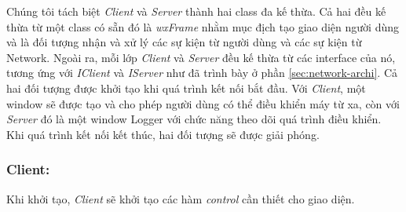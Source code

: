 Chúng tôi tách biệt \textit{Client} và \textit{Server} thành hai class đa kế thừa. Cả hai đều kế thừa từ một class có sẵn đó là \textit{wxFrame} nhằm mục địch tạo giao diện người dùng và là đối tượng nhận và xử lý các sự kiện từ người dùng và các sự kiện từ Network. Ngoài ra, mỗi lớp \textit{Client} và \textit{Server} đều kế thừa từ các interface của nó, tương ứng với \textit{IClient} và \textit{IServer} như đã trình bày ở phần \ref{sec:network-archi}. Cả hai đối tượng được khởi tạo khi quá trình kết nối bắt đầu. Với \textit{Client}, một window sẽ được tạo và cho phép người dùng có thể điều khiển máy từ xa, còn với \textit{Server} đó là một window Logger với chức năng theo dõi quá trình điều khiển. Khi quá trình kết nối kết thúc, hai đối tượng sẽ được giải phóng.

\subsubsection{Client: }
Khi khởi tạo, \textit{Client} sẽ khởi tạo các hàm \textit{control} cần thiết cho giao diện.


